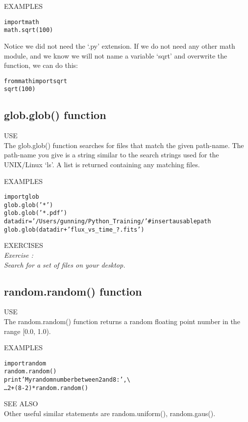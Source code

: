 {\color{blue} {\sf\small EXAMPLES}} 
\begin{alltt}
\pytab import math
\pytab math.sqrt(100)
\end{alltt}
Notice we did not need the `.py' extension. If we do not need any other
math module, and we know we will not name a variable `sqrt' and
overwrite the function, we can do this:
\begin{alltt}
\pytab from math import sqrt
\pytab sqrt(100)
\end{alltt}

\subsection{ {\sf glob.glob() } function}
{\color{blue} {\sf\small USE}} \\
The {\sf\small glob.glob()} function searches for files that match
the given path-name.  The path-name you give is a string similar to
the search strings used for the UNIX/Linux `ls'.  A list is returned
containing any matching files.

{\color{blue} {\sf\small EXAMPLES}} 
\begin{alltt}
\pytab import glob 
\pytab glob.glob('*') 
\pytab glob.glob('*.pdf')  
\pytab datadir = '/Users/gunning/Python_Training/'  #insert a usable path
\pytab glob.glob(datadir + 'flux_vs_time_?.fits')
\end{alltt}
{\color{blue} {\sf\small EXERCISES}} \\
{\it Exercise  :  \\
Search for a set of files on your desktop.}

\subsection{ {\sf random.random() } function}
{\color{blue} {\sf\small USE}} \\
The {\sf\small random.random()} function returns a random floating point
number in the range [0.0, 1.0). 
  
{\color{blue} {\sf\small EXAMPLES}} 
\begin{alltt}
\pytab import random 
\pytab random.random() 
\pytab print 'My random number between 2 and 8: ', \textbackslash
\ldots    2 + (8-2) * random.random()
\end{alltt}
{\color{blue} {\sf\small SEE ALSO}} \\
Other useful similar statements are {\sf\small random.uniform(), random.gaus()}.  \\

